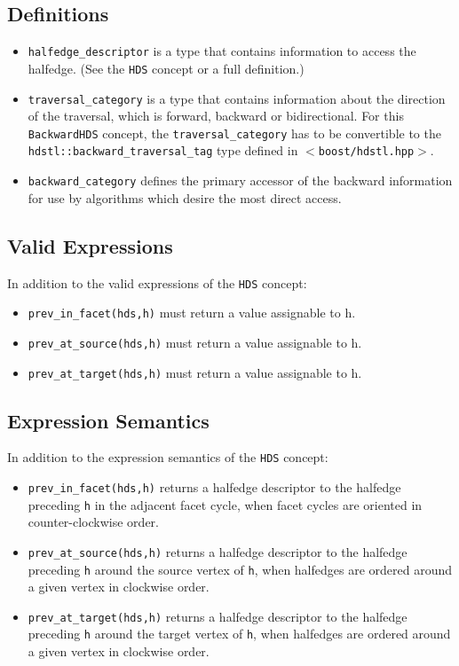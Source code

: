 \subsection{Definitions}\label{backwardhds_refbackwardhds5}
\begin{itemize}
\item {\tt halfedge\_\-descriptor} is a type that contains information to access the halfedge. (See the {\tt HDS} concept or a full definition.)\item {\tt traversal\_\-category} is a type that contains information about the direction of the traversal, which is forward, backward or bidirectional. For this {\tt Backward\-HDS} concept, the {\tt traversal\_\-category} has to be convertible to the {\tt hdstl::backward\_\-traversal\_\-tag} type defined in {\tt $<$boost/hdstl.hpp$>$}.\item {\tt backward\_\-category} defines the primary accessor of the backward information for use by algorithms which desire the most direct access.\end{itemize}
\subsection{Valid Expressions}\label{backwardhds_refbackwardhds6}
In addition to the valid expressions of the {\tt HDS} concept:\begin{itemize}
\item {\tt prev\_\-in\_\-facet(hds,h)} must return a value assignable to h.\item {\tt prev\_\-at\_\-source(hds,h)} must return a value assignable to h.\item {\tt prev\_\-at\_\-target(hds,h)} must return a value assignable to h.\end{itemize}
\subsection{Expression Semantics}\label{backwardhds_refbackwardhds7}
In addition to the expression semantics of the {\tt HDS} concept:\begin{itemize}
\item {\tt prev\_\-in\_\-facet(hds,h)} returns a halfedge descriptor to the halfedge preceding {\tt h} in the adjacent facet cycle, when facet cycles are oriented in counter-clockwise order.\item {\tt prev\_\-at\_\-source(hds,h)} returns a halfedge descriptor to the halfedge preceding {\tt h} around the source vertex of {\tt h}, when halfedges are ordered around a given vertex in clockwise order.\item {\tt prev\_\-at\_\-target(hds,h)} returns a halfedge descriptor to the halfedge preceding {\tt h} around the target vertex of {\tt h}, when halfedges are ordered around a given vertex in clockwise order.\end{itemize}
